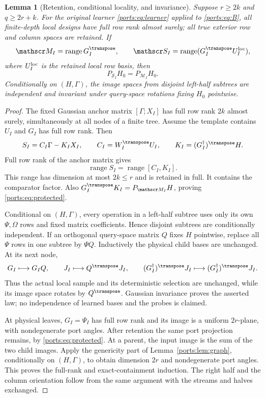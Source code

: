 \documentclass[11pt,oneside,openany,a4paper]{book}
\numberwithin{equation}{chapter}
\newtheorem{lemma}[theorem]{Lemma}
\theoremstyle{definition}
\theoremstyle{remark}
\DeclareMathOperator{\ran}{range}\DeclareMathOperator{\OPT}{OPT}
\begin{document}
\begin{lemma}[Retention, conditional locality, and invariance]\label{ports:lem:actual}
Suppose $r\ge2k$ and $q\ge2r+k$. For the original learner \eqref{ports:eq:learner} applied to \eqref{ports:eq:B}, all finite-depth local designs have full row rank almost surely; all true exterior row and column spaces are retained. If
\[
 \mathscr M_I=\ran G_I^\transpose,\qquad
 \mathscr S_I=\ran(G_I^\transpose U_I^{\rm loc}),
\]
where $U_I^{\rm loc}$ is the retained local row basis, then
\begin{equation}\label{ports:eq:protected}
 P_{\mathscr S_I}H_0=P_{\mathscr M_I}H_0.
\end{equation}
Conditionally on $(H,\Gamma)$, the image spaces from disjoint left-half subtrees are independent and invariant under query-space rotations fixing $H_0$ pointwise.
\end{lemma}
\begin{proof}
The fixed Gaussian anchor matrix $[\Gamma;X_I]$ has full row rank $2k$ almost surely, simultaneously at all nodes of a finite tree. Assume the template contains $U_I$ and $G_I$ has full row rank. Then
\[
 S_I=C_I\Gamma-K_I X_I,\qquad
 C_I=W_I^\transpose U_I,\qquad K_I=(G_I^\dagger)^\transpose H.
\]
Full row rank of the anchor matrix gives
\begin{equation}\label{ports:eq:span}
 \ran S_I=\ran[C_I,K_I].
\end{equation}
This range has dimension at most $2k\le r$ and is retained in full. It contains the comparator factor. Also
$G_I^\transpose K_I=P_{\mathscr M_I}H$, proving \eqref{ports:eq:protected}.

Conditional on $(H,\Gamma)$, every operation in a left-half subtree uses only its own $\Psi,\Omega$ rows and fixed matrix coefficients. Hence disjoint subtrees are conditionally independent. If an orthogonal query-space matrix $Q$ fixes $H$ pointwise, replace all $\Psi$ rows in one subtree by $\Psi Q$. Inductively the physical child bases are unchanged. At its next node,
\[
 G_I\longmapsto G_IQ,\qquad J_I\longmapsto Q^\transpose J_I,
 \qquad (G_I^\dagger)^\transpose J_I\longmapsto
 (G_I^\dagger)^\transpose J_I.
\]
Thus the actual local sample and its deterministic selection are unchanged, while its image space rotates by $Q^\transpose$. Gaussian invariance proves the asserted law; no independence of learned bases and the probes is claimed.

At physical leaves, $G_I=\Psi_I$ has full row rank and its image is a uniform $2r$-plane, with nondegenerate port angles. After retention the same port projection remains, by \eqref{ports:eq:protected}. At a parent, the input image is the sum of the two child images. Apply the genericity part of Lemma~\ref{ports:lem:graph}, conditionally on $(H,\Gamma)$, to obtain dimension $2r$ and nondegenerate port angles. This proves the full-rank and exact-containment induction. The right half and the column orientation follow from the same argument with the streams and halves exchanged.
\end{proof}
\end{document}
